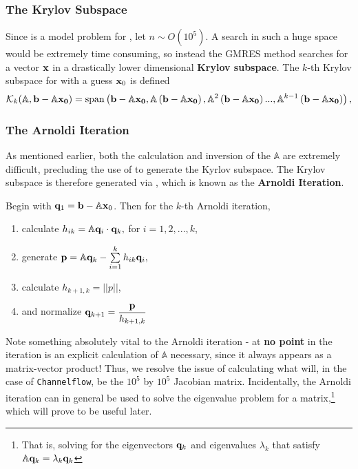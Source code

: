 \subsubsection{The Krylov Subspace}
Since  is a model problem for , let $n \sim O(10^5)$. A search in such a huge space would be extremely time consuming, so instead the GMRES method searches for a vector $\mathbf{x}$ in a drastically lower dimensional {\bf Krylov subspace}. The $k$-th Krylov subspace for  with a guess $\mathbf{x}_0$ is defined
\begin{equation}\label{eq:krylov}
\mathcal{K}_k(\mathbb{A},\mathbf{b}-\mathbb{A}\mathbf{x_0}) = \mathrm{span}\left ( \mathbf{b}-\mathbb{A}\mathbf{x_0},\mathbb{A}\left ( \mathbf{b}-\mathbb{A}\mathbf{x_0} \right ),\mathbb{A}^2\left ( \mathbf{b}-\mathbb{A}\mathbf{x_0} \right )...,\mathbb{A}^{k-1}\left ( \mathbf{b}-\mathbb{A}\mathbf{x_0} \right ) \right ),
 \end{equation}

 \subsubsection{The Arnoldi Iteration}
 
As mentioned earlier, both the calculation and inversion of the $\mathbb{A}$ are extremely difficult, precluding the use of  to generate the Kyrlov subspace. The Krylov subspace is therefore generated via , which is known as the {\bf Arnoldi Iteration}. 
\begin{algorithm}\label{alg:Arnoldi}
Begin with $\mathbf{q}_1 = \mathbf{b} - \mathbb{A}\mathbf{x}_0$. Then for the $k$-th Arnoldi iteration,
\begin{enumerate}
\item calculate $h_{ik} = \mathbb{A}\mathbf{q}_{i} \cdot \mathbf{q}_k,$ for $i = 1,2,...,k$,
\item generate $\Vector{p} = \mathbb{A}\Vector{q}_k - \sum{i=1}{k}{h_{ik}\Vector{q}_i},$ 
\item calculate $h_{k+1,k} = ||p||$,
\item and normalize $\mathbf{q}_{k+1} = \dfrac{\mathbf{p}}{h_{k+1,k}}$
\end{enumerate}
\end{algorithm}
Note something absolutely vital to the Arnoldi iteration - at {\bf no point} in the iteration is an explicit calculation of $\mathbb{A}$ necessary, since it always appears as a matrix-vector product! Thus, we resolve the issue of calculating what will, in the case of {\tt Channelflow}, be the $10^5$ by $10^5$ Jacobian matrix.  Incidentally, the Arnoldi iteration can in general be used to solve the eigenvalue problem for a matrix,\footnote{That is, solving for the eigenvectors $\mathbf{q}_k$ and eigenvalues $\lambda_k$ that satisfy $\mathbb{A}\mathbf{q}_k = \lambda_k\mathbf{q}_k$} which will prove to be useful later.\\

